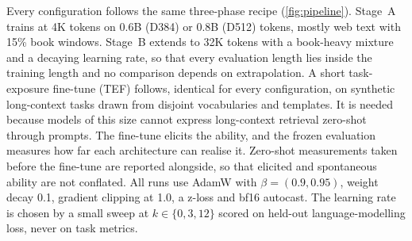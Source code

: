 \documentclass[10pt,a4paper]{article}
\begin{document}
Every configuration follows the same three-phase recipe (\cref{fig:pipeline}). Stage~A trains at 4K
tokens on 0.6B (D384) or 0.8B (D512) tokens, mostly web text with 15\% book windows. Stage~B extends
to 32K tokens with a book-heavy mixture and a decaying learning rate, so that every evaluation length
lies inside the training length and no comparison depends on extrapolation. A short task-exposure
fine-tune (TEF) follows, identical for every configuration, on synthetic long-context tasks drawn from
disjoint vocabularies and templates. It is needed because models of this size cannot express
long-context retrieval zero-shot through prompts. The fine-tune elicits the ability, and the frozen
evaluation measures how far each architecture can realise it. Zero-shot measurements taken before
the fine-tune are reported alongside, so that elicited and spontaneous ability are not conflated.
All runs use AdamW \citep{loshchilov2019adamw} with $\beta=(0.9,0.95)$, weight decay 0.1, gradient
clipping at 1.0, a z-loss and bf16 autocast. The learning rate is chosen by a small sweep at
$k\in\{0,3,12\}$ scored on held-out language-modelling loss, never on task metrics.
\end{document}
